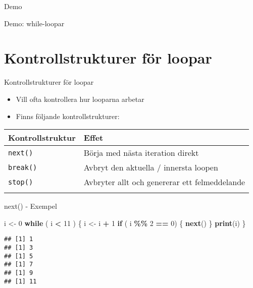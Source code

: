 \documentclass[
  11pt,
  ignorenonframetext,
]{beamer}
\newenvironment{Shaded}{\begin{snugshade}}{\end{snugshade}}
\newcommand{\ControlFlowTok}[1]{\textcolor[rgb]{0.13,0.29,0.53}{\textbf{#1}}}
\newcommand{\DecValTok}[1]{\textcolor[rgb]{0.00,0.00,0.81}{#1}}
\newcommand{\FunctionTok}[1]{\textcolor[rgb]{0.13,0.29,0.53}{\textbf{#1}}}
\newcommand{\NormalTok}[1]{#1}
\newcommand{\OtherTok}[1]{\textcolor[rgb]{0.56,0.35,0.01}{#1}}
\newcommand{\SpecialCharTok}[1]{\textcolor[rgb]{0.81,0.36,0.00}{\textbf{#1}}}
\providecommand{\tightlist}{%
  \setlength{\itemsep}{0pt}\setlength{\parskip}{0pt}}
\begin{document}
\begin{frame}{Demo}
\label{demo-3}
\begin{block}{Demo: while-loopar}
\label{demo-while-loopar}
\end{block}
\end{frame}

\section{Kontrollstrukturer för
loopar}\label{kontrollstrukturer-fuxf6r-loopar}

\begin{frame}{Kontrollstrukturer för loopar}
\label{kontrollstrukturer-fuxf6r-loopar-1}
\begin{itemize}
\tightlist
\item
  Vill ofta kontrollera hur looparna arbetar
\item
  Finns följande kontrollstrukturer:
\end{itemize}

\begin{longtable}[]{@{}ll@{}}
\toprule\noalign{}
\textbf{Kontrollstruktur} & \textbf{Effet} \\
\midrule\noalign{}
\endhead
\texttt{next()} & Börja med nästa iteration direkt \\
\texttt{break()} & Avbryt den aktuella / innersta loopen \\
\texttt{stop()} & Avbryter allt och genererar ett felmeddelande \\
\bottomrule\noalign{}
\end{longtable}
\end{frame}

\begin{frame}[fragile]{next() - Exempel}
\label{next---exempel}
\begin{Shaded}
\begin{Highlighting}[]
\NormalTok{i }\OtherTok{\textless{}{-}} \DecValTok{0}
\ControlFlowTok{while}\NormalTok{ ( i }\SpecialCharTok{\textless{}} \DecValTok{11}\NormalTok{ ) \{}
\NormalTok{  i }\OtherTok{\textless{}{-}}\NormalTok{ i }\SpecialCharTok{+} \DecValTok{1}
  \ControlFlowTok{if}\NormalTok{ ( i }\SpecialCharTok{\%\%} \DecValTok{2} \SpecialCharTok{==} \DecValTok{0}\NormalTok{) \{ }\ControlFlowTok{next}\NormalTok{() \}}
  \FunctionTok{print}\NormalTok{(i)}
\NormalTok{\}}
\end{Highlighting}
\end{Shaded}

\pause

\begin{verbatim}
## [1] 1
## [1] 3
## [1] 5
## [1] 7
## [1] 9
## [1] 11
\end{verbatim}
\end{frame}
\end{document}
